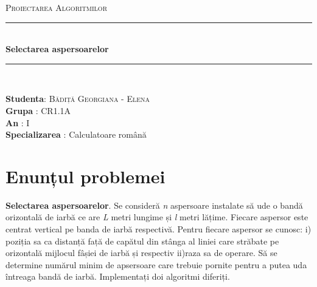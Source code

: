 \documentclass{article}
\begin{document}
\begin{titlepage} 
	\newcommand{\HRule}{\rule{\linewidth}{0,6mm}}
	
	\center
	
	\textsc{\huge Proiectarea Algoritmilor}\\[5cm] 

	\HRule\\[0.8cm]
	
	{\Huge\bfseries Selectarea aspersoarelor}\\[0.6cm] %
	
	\HRule\\[1.9cm]
   
	\vspace{20mm}
	\begin{minipage}{1\textwidth}
		\begin{flushleft}
	        \centering
			\huge
			\textbf{Studenta}: \textsc{Bădiță Georgiana - Elena}\\
			 \textbf{Grupa} : CR1.1A\\
			 \textbf{An} : I\\
			 \textbf{Specializarea} : Calculatoare română\\
			
			
		\end{flushleft}
	\end{minipage}
\end{titlepage}


\newpage


\section{Enunțul problemei}
\textbf {Selectarea aspersoarelor}. Se consideră \textsl {n} aspersoare instalate să ude o
bandă  orizontală de iarbă ce are \textsl{L} metri lungime și \textsl{l} metri lățime. Fiecare aspersor este centrat vertical pe banda de iarbă respectivă. Pentru fiecare aspersor se cunosc: i) poziția sa ca distanță față de capătul din stânga  al liniei care străbate  pe orizontală mijlocul fâșiei de iarbă  și respectiv ii)raza sa de operare. Să se determine numărul minim de apsersoare care trebuie pornite pentru a putea uda întreaga bandă de iarbă. Implementați
doi algoritmi diferiți.

\vspace{5mm}
\end{document}
